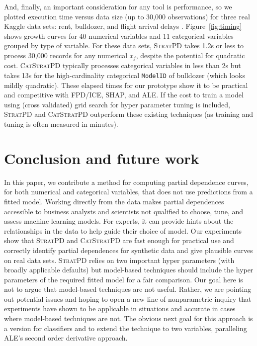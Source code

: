 \documentclass[smallextended]{svjour3}       %
\newcommand{\figref}[1]{Figure~\ref{#1}}
\newcommand{\cut}[1]{}
\newcommand{\spd}{\fontfamily{cmr}\textsc{\small StratPD}}
\newcommand{\cspd}{\fontfamily{cmr}\textsc{\small CatStratPD}}
\begin{document}
And, finally, an important consideration for any tool is performance, so we plotted execution time versus data size (up to 30,000 observations) for three real Kaggle data sets: rent, bulldozer, and flight arrival delays \citep{flights}. \figref{fig:timing} shows growth curves for 40 numerical variables and 11 categorical variables grouped by type of variable.  For these data sets, \spd{} takes 1.2s or less to process 30,000 records for any  numerical $x_j$, despite the potential for quadratic cost. \cspd{} typically processes categorical variables in less than 2s but takes 13s for the high-cardinality categorical {\tt\small ModelID} of bulldozer (which looks mildly quadratic).  These elapsed times for our prototype show it to be practical and competitive with FPD/ICE, SHAP, and ALE.  If the cost to train a model using (cross validated) grid search for hyper parameter tuning is included, \spd{} and \cspd{} outperform these existing techniques (as training and tuning is often measured in minutes).


\cut{
flight shape (5714008, 17), 6 cats
rent shape (49352, 20), no cats
bulldozer shape (362781, 14) records, 5 cats
}

\section{Conclusion and future work}

In this paper, we contribute a method for computing partial dependence curves, for both numerical and categorical variables, that does not use  predictions from a fitted model.   Working directly from the data  makes partial dependences accessible to business analysts and scientists not qualified to choose, tune, and assess machine learning models.  For experts, it can  provide hints about the relationships in the data to help guide their choice of model. Our experiments show that \spd{} and \cspd{} are fast enough for practical use and correctly identify partial dependences for synthetic data and give plausible curves on real data sets. \spd{} relies on two important hyper parameters (with broadly applicable defaults) but model-based techniques should include the hyper parameters of the required fitted model for a fair comparison.  Our goal here is not to  argue  that model-based techniques are not useful. Rather, we are pointing out potential issues and hoping to open a new line of nonparametric inquiry that experiments have shown to be applicable in situations and accurate in cases where model-based techniques are not. The obvious next goal for this approach is a version for classifiers and to extend the technique to two variables, paralleling ALE's second order derivative approach.
\end{document}
